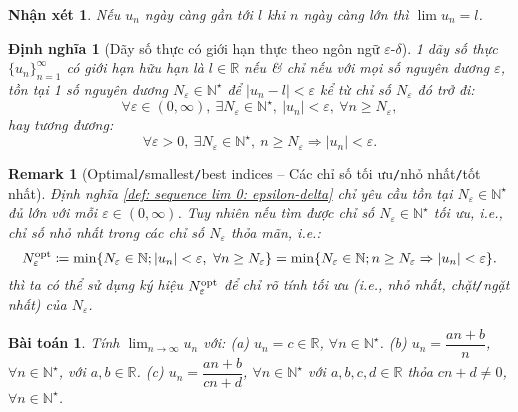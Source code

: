 \documentclass[oneside]{book}
\newtheorem{baitoan}{Bài toán}
\newtheorem{dinhnghia}{Định nghĩa}
\newtheorem{nhanxet}{Nhận xét}
\newtheorem{remark}{Remark}
\begin{document}
\begin{nhanxet}
	Nếu $u_n$ ngày càng gần tới $l$ khi $n$ ngày càng lớn thì $\lim u_n = l$.
\end{nhanxet}

\begin{dinhnghia}[Dãy số thực có giới hạn thực theo ngôn ngữ $\varepsilon$-$\delta$]
	\label{def: sequence lim: epsilon-delta}
	1 dãy số thực $\{u_n\}_{n=1}^\infty$ có giới hạn hữu hạn là $l\in\mathbb{R}$ nếu \& chỉ nếu với mọi số nguyên dương $\varepsilon$, tồn tại 1 số nguyên dương $N_\varepsilon\in\mathbb{N}^\star$ để $|u_n - l| < \varepsilon$ kể từ chỉ số $N_\varepsilon$ đó trở đi:	
	\begin{equation*}
		\forall\varepsilon\in(0,\infty),\ \exists N_\varepsilon\in\mathbb{N}^\star,\ |u_n| < \varepsilon,\ \forall n\ge N_\varepsilon,
	\end{equation*}
	hay tương đương:
	\begin{equation*}
		\forall\varepsilon > 0,\ \exists N_\varepsilon\in\mathbb{N}^\star,\ n\ge N_\varepsilon\Rightarrow|u_n| < \varepsilon.
	\end{equation*}
\end{dinhnghia}

\begin{remark}[Optimal{\tt/}smallest{\tt/}best indices -- Các chỉ số tối ưu{\tt/}nhỏ nhất{\tt/}tốt nhất]
	Định nghĩa \ref{def: sequence lim 0: epsilon-delta} chỉ yêu cầu tồn tại $N_\varepsilon\in\mathbb{N}^\star$ đủ lớn với mỗi $\varepsilon\in(0,\infty)$. Tuy nhiên nếu tìm được chỉ số $N_\varepsilon\in\mathbb{N}^\star$ tối ưu, i.e., chỉ số nhỏ nhất trong các chỉ số $N_\varepsilon$ thỏa mãn, i.e.:
	\begin{equation*}
		N_\varepsilon^{\rm opt}\coloneqq\min\{N_\varepsilon\in\mathbb{N};|u_n| < \varepsilon,\ \forall n\ge N_\varepsilon\} = \min\{N_\varepsilon\in\mathbb{N};n\ge N_\varepsilon\Rightarrow|u_n| < \varepsilon\}.
	\end{equation*}
	thì ta có thể sử dụng ký hiệu $N_\varepsilon^{\rm opt}$ để chỉ rõ tính tối ưu (i.e., nhỏ nhất, chặt{\tt/}ngặt nhất) của $N_\varepsilon$.
\end{remark}

\begin{baitoan}
	Tính $\lim_{n\to\infty} u_n$ với: (a) $u_n = c\in\mathbb{R}$, $\forall n\in\mathbb{N}^\star$. (b) $u_n = \dfrac{an + b}{n}$, $\forall n\in\mathbb{N}^\star$, với $a,b\in\mathbb{R}$. (c) $u_n = \dfrac{an + b}{cn + d}$, $\forall n\in\mathbb{N}^\star$ với $a,b,c,d\in\mathbb{R}$ thỏa $cn + d\ne0$, $\forall n\in\mathbb{N}^\star$.
\end{baitoan}
\end{document}
